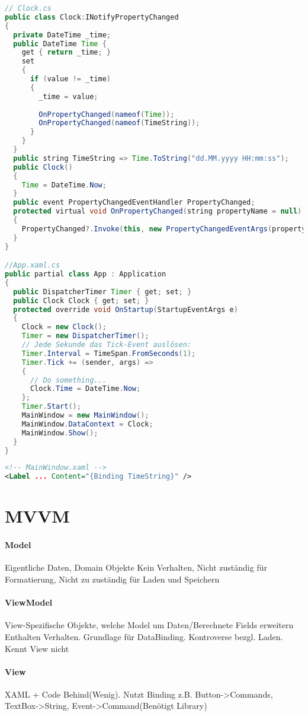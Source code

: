 \begin{lstlisting}[language=java]
// Clock.cs
public class Clock:INotifyPropertyChanged
{
  private DateTime _time;
  public DateTime Time {
    get { return _time; }
    set
    {
      if (value != _time)
      {
        _time = value;
    
        OnPropertyChanged(nameof(Time));
        OnPropertyChanged(nameof(TimeString));
      } 
    }
  }
  public string TimeString => Time.ToString("dd.MM.yyyy HH:mm:ss");
  public Clock()
  {
    Time = DateTime.Now;
  }
  public event PropertyChangedEventHandler PropertyChanged;
  protected virtual void OnPropertyChanged(string propertyName = null)
  {
    PropertyChanged?.Invoke(this, new PropertyChangedEventArgs(propertyName));
  }
}

//App.xaml.cs
public partial class App : Application
{
  public DispatcherTimer Timer { get; set; }
  public Clock Clock { get; set; }
  protected override void OnStartup(StartupEventArgs e)
  {
    Clock = new Clock();
    Timer = new DispatcherTimer();
    // Jede Sekunde das Tick-Event auslösen:
    Timer.Interval = TimeSpan.FromSeconds(1);
    Timer.Tick += (sender, args) =>
    {
      // Do something...
      Clock.Time = DateTime.Now;
    };
    Timer.Start();
    MainWindow = new MainWindow();
    MainWindow.DataContext = Clock;
    MainWindow.Show();
  }
}
\end{lstlisting}

\begin{lstlisting}[language=xml]
<!-- MainWindow.xaml -->
<Label ... Content="{Binding TimeString}" />
\end{lstlisting}

\section{MVVM}
\paragraph{Model} Eigentliche Daten, Domain Objekte Kein
Verhalten, Nicht zuständig für Formatierung, Nicht zu zuständig für Laden und Speichern
\paragraph{ViewModel} View-Spezifische Objekte, welche Model um Daten/Berechnete Fields erweitern Enthalten Verhalten. Grundlage für DataBinding. Kontroverse bezgl. Laden. Kennt View nicht
\paragraph{View} XAML + Code Behind(Wenig). Nutzt Binding z.B. Button->Commands, TextBox->String, Event->Command(Benötigt Library)
